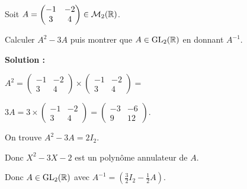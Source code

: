 \documentclass[12pt, a4paper]{report}
\begin{document}
\begin{example}
    Soit $A = \left(\begin{matrix} -1 & -2 \\ 3 & 4 \end{matrix}\right) \in \mathcal M_2(\mathbb{R})$.

    Calculer $A^2-3A$ puis montrer que $A \in \mathrm{GL}_2(\mathbb{R})$ en donnant $A^{-1}$.

    \textbf{Solution :}

    $A^2 = \left(\begin{matrix} -1 & -2 \\ 3 & 4 \end{matrix}\right) \times \left(\begin{matrix} -1 & -2 \\ 3 & 4 \end{matrix}\right) = $

    $3A = 3 \times \left(\begin{matrix} -1 & -2 \\ 3 & 4 \end{matrix}\right) = \left(\begin{matrix} -3 & -6 \\ 9 & 12 \end{matrix}\right)$.

    On trouve $A^2 - 3A = 2I_2$.

    Donc $X^2 - 3X - 2$ est un polynôme annulateur de $A$.

    Donc $A \in \mathrm{GL}_2(\mathbb{R})$ avec $A^{-1} = (\frac32 I_2 - \frac12 A)$.
\end{example}
\end{document}
